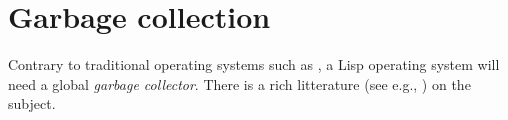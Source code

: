 \chapter{Garbage collection}

Contrary to traditional operating systems such as \unix{}, a Lisp
operating system will need a global \emph{garbage collector}.  There 
is a rich litterature (see e.g., \cite{Jones:2011:GCH:2025255}) on the
subject. 

